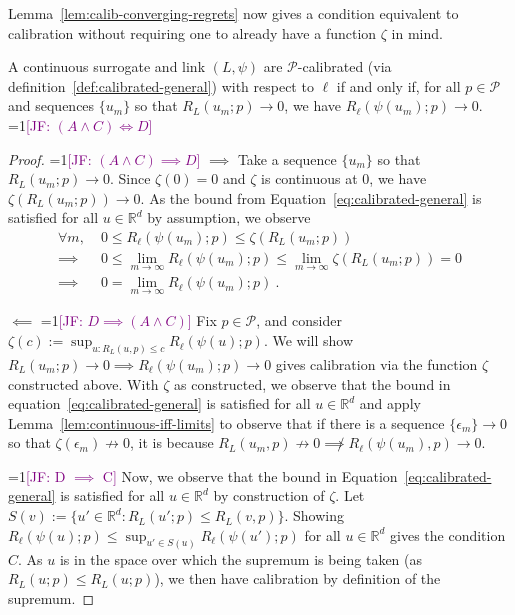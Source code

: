 \documentclass[anon,12pt]{colt2021} %
\newcommand{\Comments}{1}
\newcommand{\mynote}[2]{\ifnum\Comments=1\textcolor{#1}{#2}\fi}
\newcommand{\jessie}[1]{\mynote{purple}{[JF: #1]}}
\newcommand{\reals}{\mathbb{R}}
\renewcommand{\P}{\mathcal{P}}
\begin{document}
Lemma~\ref{lem:calib-converging-regrets} now gives a condition equivalent to calibration without requiring one to already have a function $\zeta$ in mind.
\begin{lemma}\label{lem:calib-converging-regrets}
	A continuous surrogate and link $(L,\psi)$ are $\P$-calibrated (via definition~\ref{def:calibrated-general}) with respect to $\ell$ if and only if, for all $p \in \P$ and sequences $\{u_m\}$ so that $R_L(u_m; p) \to 0$, we have $R_\ell(\psi(u_m); p) \to 0$.
	\jessie{$(A \wedge C) \iff D$}
\end{lemma}
\begin{proof}
\jessie{$(A \wedge C) \implies D$}
	$\implies$ Take a sequence $\{u_m\}$ so that $R_L(u_m;p) \to 0$.
	Since $\zeta(0) = 0$ and $\zeta$ is continuous at $0$, we have $\zeta(R_L(u_m;p)) \to 0$.
	As the bound from Equation~\eqref{eq:calibrated-general} is satisfied for all $u \in \reals^d$ by assumption, we observe
	\begin{align*}
	\forall m, \; &0 \leq R_\ell(\psi(u_m); p) \leq \zeta(R_L(u_m;p))\\
	\implies &0 \leq \lim_{m \to \infty} R_\ell(\psi(u_m); p) \leq \lim_{m \to \infty} \zeta(R_L(u_m;p)) = 0\\
	\implies &0 = \lim_{m\to\infty} R_\ell(\psi(u_m); p) ~.~
	\end{align*}
	
	
	$\impliedby$ 
\jessie{$D \implies (A \wedge C)$}
	Fix $p \in \P$, and consider $\zeta(c) := \sup_{u: R_L(u,p) \leq c} R_\ell(\psi(u); p)$.  
	We will show $R_L(u_m; p) \to 0 \implies R_\ell(\psi(u_m); p) \to 0$ gives calibration via the function $\zeta$ constructed above. 
	With $\zeta$ as constructed, we observe that the bound in equation~\eqref{eq:calibrated-general} is satisfied for all $u \in \reals^d$ and apply Lemma~\ref{lem:continuous-iff-limits} to observe that if there is a sequence $\{\epsilon_m\} \to 0$ so that $\zeta(\epsilon_m) \not \to 0$, it is because $R_L(u_m, p) \not \to 0 \not\implies R_\ell(\psi(u_m), p) \to 0$.
	

\jessie{D $\implies$ C}
Now, we observe that the bound in Equation~\eqref{eq:calibrated-general} is satisfied for all $u \in \reals^d$ by construction of $\zeta$.
Let $S(v) := \{u' \in \reals^d : R_L(u';p) \leq R_L(v,p) \}$.
Showing $R_\ell(\psi(u);p) \leq \sup_{u' \in S(u)} R_\ell(\psi(u') ; p)$ for all $u \in \reals^d$ gives the condition $C$.
As $u$ is in the space over which the supremum is being taken (as $R_L(u;p) \leq R_L(u;p)$), we then have calibration by definition of the supremum.


\end{proof}
\end{document}
